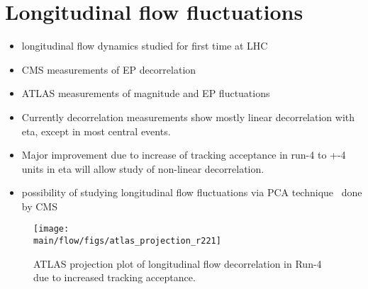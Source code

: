 \section{Longitudinal flow fluctuations}

\begin{itemize}
	\item longitudinal flow dynamics studied for first time at LHC
	\item CMS measurements of EP decorrelation~\cite{CMS-HIN-15-008}
	\item ATLAS measurements of magnitude and EP fluctuations~\cite{HION-2016-04}
	\item Currently decorrelation measurements show mostly linear decorrelation with eta, 
		    except in most central events.
	\item Major improvement due to increase of tracking acceptance in run-4 to +-4 units 
		    in eta will allow study of non-linear decorrelation.
	\item possibility of studying longitudinal flow fluctuations via PCA technique~\cite{Bhalerao:2014mua} done by CMS
\end{itemize}


\begin{figure*}[!htb]
\begin{center}
\texttt{[image: \\main/flow/figs/atlas\_projection\_r221]}
\caption{
ATLAS projection plot of longitudinal flow decorrelation in Run-4 
	due to increased tracking acceptance.
}
\label{fig:atlas_r221}
\end{center}
\end{figure*}

